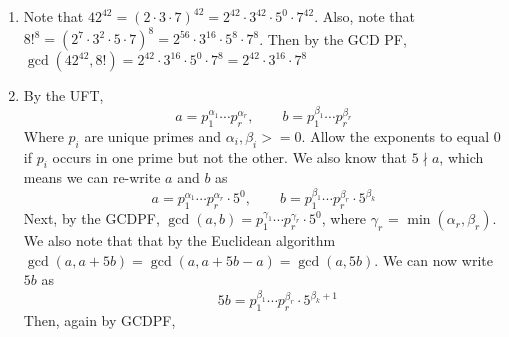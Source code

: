 \documentclass[10pt]{article}
\begin{document}
\begin{enumerate}
    \item
    Note that $42^{42} = (2\cdot 3\cdot 7)^{42} = 2^{42}\cdot 3^{42} \cdot 5^0 \cdot 7^{42}$. Also, note that $8!^8 = (2^7 \cdot 3^2 \cdot 5 \cdot 7)^8 = 2^{56} \cdot 3^{16} \cdot 5^8 \cdot 7^8$. Then by the GCD PF, $\gcd{(42^{42}, 8!)} = 2^{42} \cdot 3^{16} \cdot 5^0 \cdot 7^8 = 2^{42} \cdot 3^{16} \cdot 7^8$
    \item
    By the UFT, 
    $$a=p_1^{\alpha_1}\cdots p_r^{\alpha_r},\qquad b=p_1^{\beta_1}\cdots p_r^{\beta_r}$$
    Where $p_i$ are unique primes and $\alpha_i, \beta_i >=0$. Allow the exponents to equal $0$ if $p_i$ occurs in one prime but not the other. We also know that $5 \nmid a$, which means we can re-write $a$ and $b$ as 
    $$a = p_1^{\alpha_1}\cdots p_r^{\alpha_r} \cdot 5^0, \qquad b=p_1^{\beta_1}\cdots p_r^{\beta_r} \cdot 5^{\beta_k}$$
    Next, by the GCDPF,
    $\gcd{(a,b)} = p_1^{\gamma_1}\cdots p_r^{\gamma_r} \cdot 5^0$, where $\gamma_r$ = $\min{(\alpha_r, \beta_r)}$. We also note that that by the Euclidean algorithm $\gcd{(a, a+5b)} = \gcd{(a, a+5b-a)} = \gcd{(a, 5b)}$. We can now write $5b$ as
        $$\qquad 5b=p_1^{\beta_1}\cdots p_r^{\beta_r} \cdot 5^{\beta_k+1}$$
    Then, again by GCDPF, 
    

\end{enumerate}
\end{document}
